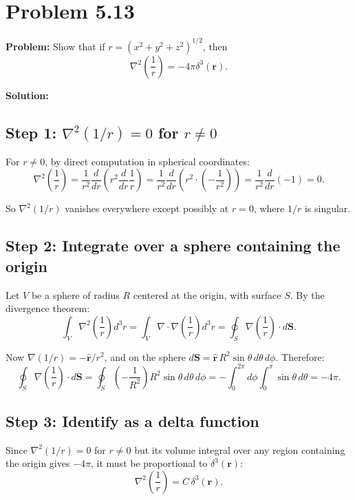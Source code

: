 \documentclass[12pt]{article}
\begin{document}
\section*{Problem 5.13}

\textbf{Problem:} Show that if $r = (x^2 + y^2 + z^2)^{1/2}$, then
\[
\nabla^2\left(\frac{1}{r}\right) = -4\pi\delta^3(\mathbf{r}).
\]

\bigskip
\textbf{Solution:}

\subsection*{Step 1: $\nabla^2(1/r) = 0$ for $r \neq 0$}

For $r \neq 0$, by direct computation in spherical coordinates:
\[
\nabla^2\left(\frac{1}{r}\right) = \frac{1}{r^2}\frac{d}{dr}\left(r^2\frac{d}{dr}\frac{1}{r}\right) = \frac{1}{r^2}\frac{d}{dr}\left(r^2\cdot\left(-\frac{1}{r^2}\right)\right) = \frac{1}{r^2}\frac{d}{dr}(-1) = 0.
\]

So $\nabla^2(1/r)$ vanishes everywhere except possibly at $r = 0$, where $1/r$ is singular.

\subsection*{Step 2: Integrate over a sphere containing the origin}

Let $V$ be a sphere of radius $R$ centered at the origin, with surface $S$. By the divergence theorem:
\[
\int_V \nabla^2\left(\frac{1}{r}\right)d^3r = \int_V \nabla\cdot\nabla\left(\frac{1}{r}\right)d^3r = \oint_S \nabla\left(\frac{1}{r}\right)\cdot d\mathbf{S}.
\]

Now $\nabla(1/r) = -\hat{\mathbf{r}}/r^2$, and on the sphere $d\mathbf{S} = \hat{\mathbf{r}}\,R^2\sin\theta\,d\theta\,d\phi$. Therefore:
\[
\oint_S \nabla\left(\frac{1}{r}\right)\cdot d\mathbf{S} = \oint_S\left(-\frac{1}{R^2}\right)R^2\sin\theta\,d\theta\,d\phi = -\int_0^{2\pi}d\phi\int_0^{\pi}\sin\theta\,d\theta = -4\pi.
\]

\subsection*{Step 3: Identify as a delta function}

Since $\nabla^2(1/r) = 0$ for $r \neq 0$ but its volume integral over any region containing the origin gives $-4\pi$, it must be proportional to $\delta^3(\mathbf{r})$:
\[
\nabla^2\left(\frac{1}{r}\right) = C\,\delta^3(\mathbf{r}).
\]
\end{document}
